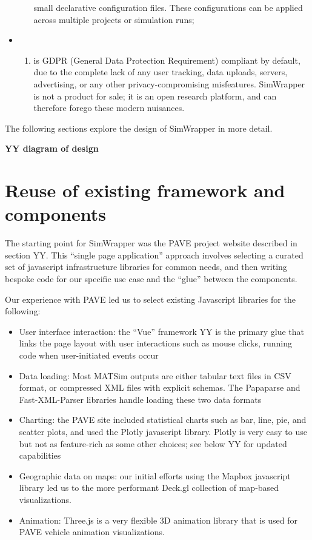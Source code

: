 \begin{itemize}
\begin{enumerate}
    small declarative configuration files. These configurations can be
    applied across multiple projects or simulation runs;
  \end{enumerate}
\item
  \begin{enumerate}
  \def\labelenumi{(\arabic{enumi})}
  \setcounter{enumi}{5}
  \item
    is GDPR (General Data Protection Requirement) compliant by default,
    due to the complete lack of any user tracking, data uploads,
    servers, advertising, or any other privacy-compromising misfeatures.
    SimWrapper is not a product for sale; it is an open research
    platform, and can therefore forego these modern nuisances.
  \end{enumerate}
\end{itemize}

The following sections explore the design of SimWrapper in more detail.

\textbf{YY diagram of design}

\hypertarget{reuse-of-existing-framework-and-components}{%
\section{Reuse of existing framework and
components}\label{reuse-of-existing-framework-and-components}}

The starting point for SimWrapper was the PAVE project website described
in section YY. This ``single page application'' approach involves
selecting a curated set of javascript infrastructure libraries for
common needs, and then writing bespoke code for our specific use case
and the ``glue'' between the components.

Our experience with PAVE led us to select existing Javascript libraries
for the following:

\begin{itemize}
\item
  User interface interaction: the ``Vue'' framework YY is the primary
  glue that links the page layout with user interactions such as mouse
  clicks, running code when user-initiated events occur
\item
  Data loading: Most MATSim outputs are either tabular text files in CSV
  format, or compressed XML files with explicit schemas. The Papaparse
  and Fast-XML-Parser libraries handle loading these two data formats
\item
  Charting: the PAVE site included statistical charts such as bar, line,
  pie, and scatter plots, and used the Plotly javascript library. Plotly
  is very easy to use but not as feature-rich as some other choices; see
  below YY for updated capabilities
\item
  Geographic data on maps: our initial efforts using the Mapbox
  javascript library led us to the more performant Deck.gl collection of
  map-based visualizations.
\item
  Animation: Three.js is a very flexible 3D animation library that is
  used for PAVE vehicle animation visualizations.
\end{itemize}

